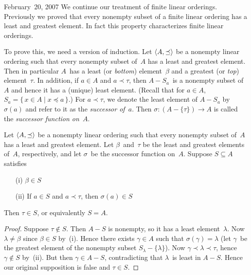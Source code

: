\begin{lecture}{February~20, 2007}
We continue our treatment of finite linear orderings. Previously we proved that every nonempty subset of a finite linear ordering has a least and greatest element. In fact this property characterizes finite linear orderings.

To prove this, we need a version of induction. Let \(\langle{A},{\preceq}\rangle\) be a nonempty linear ordering such that every nonempty subset of~\(A\) has a least and greatest element. Then in particular \(A\)~has a least (or \emph{bottom}) element~\(\beta\) and a greatest (or \emph{top}) element~\(\tau\). In addition, if \(a\in A\) and \(a\prec\tau\), then \(A-S_a\)~is a nonempty subset of~\(A\) and hence it has a (unique) least element. (Recall that for \(a\in A\), \(S_a=\{\,x\in A\mid x\preceq a\,\}\).) For \(a\prec\tau\), we denote the least element of \(A-S_a\) by~\(\sigma(a)\) and refer to it as the \emph{successor of~\(a\)}. Then \(\sigma:(A-\{\tau\})\to A\) is called the \emph{successor function on~\(A\)}.
\begin{thm}
Let \(\langle{A},{\preceq}\rangle\) be a nonempty linear ordering such that every nonempty subset of~\(A\) has a least and greatest element. Let \(\beta\)~and~\(\tau\) be the least and greatest elements of~\(A\), respectively, and let \(\sigma\)~be the successor function on~\(A\). Suppose \(S\subseteq A\) satisfies
\begin{enumerate}[itemsep=0pt]
\item[(i)] \(\beta\in S\)
\item[(ii)] If \(a\in S\) and \(a\prec\tau\), then \(\sigma(a)\in S\)
\end{enumerate}
Then \(\tau\in S\), or equivalently \(S=A\).
\end{thm}
\begin{proof}
Suppose \(\tau\not\in S\). Then \(A-S\) is nonempty, so it has a least element~\(\lambda\). Now \(\lambda\ne\beta\) since \(\beta\in S\) by~(i). Hence there exists \(\gamma\in A\) such that \(\sigma(\gamma)=\lambda\) (let \(\gamma\)~be the greatest element of the nonempty subset \(S_{\lambda}-\{\lambda\}\)). Now \(\gamma\prec\lambda\prec\tau\), hence \(\gamma\not\in S\) by~(ii). But then \(\gamma\in A-S\), contradicting that \(\lambda\)~is least in \(A-S\). Hence our original supposition is false and \(\tau\in S\).


\end{proof}
\end{lecture}
